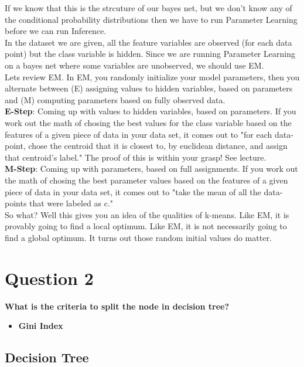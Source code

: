 \documentclass[10pt,letterpaper]{article}
\begin{document}
If we know that this is the strcuture of our bayes net, but we don't know any of the conditional probability distributions then we have to run Parameter Learning before we can run Inference.\\


In the dataset we are given, all the feature variables are observed (for each data point) but the class variable is hidden. Since we are running Parameter Learning on a bayes net where some variables are unobserved, we should use EM.\\


Lets review EM. In EM, you randomly initialize your model parameters, then you alternate between (E) assigning values to hidden variables, based on parameters and (M) computing parameters based on fully observed data.\\


\textbf{E-Step}: Coming up with values to hidden variables, based on parameters. If you work out the math of chosing the best values for the class variable based on the features of a given piece of data in your data set, it comes out to "for each data-point, chose the centroid that it is closest to, by euclidean distance, and assign that centroid's label." The proof of this is within your grasp! See lecture.\\


\textbf{M-Step}: Coming up with parameters, based on full assignments. If you work out the math of chosing the best parameter values based on the features of a given piece of data in your data set, it comes out to "take the mean of all the data-points that were labeled as c."\\


So what? Well this gives you an idea of the qualities of k-means. Like EM, it is provably going to find a local optimum. Like EM, it is not necessarily going to find a global optimum. It turns out those random initial values do matter.\\


\section{Question 2}
\textbf{What is the criteria to split the node in decision tree?}
\begin{itemize}
\item \textbf{Gini Index}
\end{itemize}

\subsection{Decision Tree}
\end{document}
